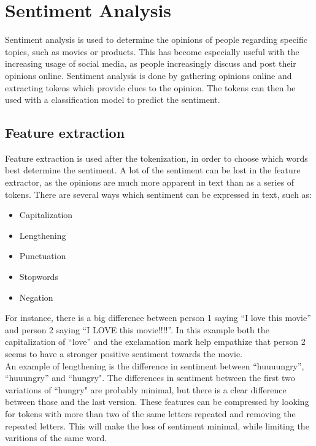 \section{Sentiment Analysis}\label{SentiAnal}
Sentiment analysis is used to determine the opinions of people regarding
specific topics, such as movies or products. This has become especially useful
with the increasing usage of social media, as people increasingly discuss and
post their opinions online. Sentiment analysis is done by gathering opinions
online and extracting tokens which provide clues to the opinion. The tokens can
then be used with a classification model to predict the sentiment.

\subsection{Feature extraction} 
Feature extraction is used after the tokenization, in order to choose which
words best determine the sentiment. A lot of the sentiment can be lost in the
feature extractor, as the opinions are much more apparent in text than as a
series of tokens. There are several ways which sentiment can be expressed in
text, such as\citep[Ch.3-4]{Sentiment}:

\begin{itemize}
  \item Capitalization 
  \item Lengthening
  \item Punctuation
  \item Stopwords
  \item Negation
\end{itemize}

For instance, there is a big difference between person 1 saying ``I love this
movie'' and person 2 saying ``I LOVE this movie!!!!''. In this example both the
capitalization of ``love'' and the exclamation mark help empathize that person
2 seems to have a stronger positive sentiment towards the movie.\\

An example of lengthening is the difference in sentiment between ``huuuungry'',
``huuungry'' and ``hungry". The differences in sentiment between the first two
variations of ``hungry" are probably minimal, but there is a clear difference
between those and the last version. These features can be compressed by looking
for tokens with more than two of the same letters repeated and removing the
repeated letters. This will make the loss of sentiment minimal, while limiting
the varitions of the same word.\nl

